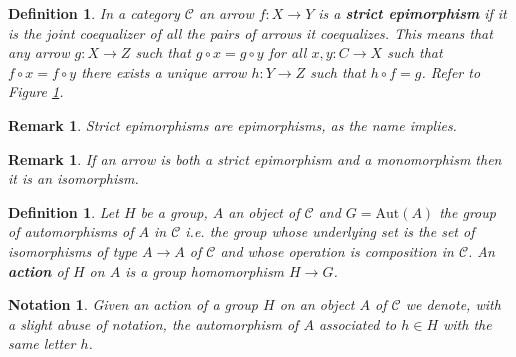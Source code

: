 \documentclass[italian, 12pt, reqno]{article}
\theoremstyle{myteo}
\newtheorem{definition}[theorem]{Definition}
\newtheorem{remark}[theorem]{Remark}
\newtheorem{notation}[theorem]{Notation}
\numberwithin{equation}{section}
\newcommand{\cat}[1]{\mathscr{#1}}
\newcommand{\aut}{\text{Aut}}
\newcommand{\fun}[3]{#1\colon#2\to #3}
\begin{document}
\begin{definition}
  \label{def:strit_epi}
  In a category \(\cat{C}\) an arrow \(\fun{f}{X}{Y}\) is a \textbf{strict epimorphism} if it is the joint coequalizer of all the pairs of arrows it coequalizes.
  This means that any arrow \(\fun{g}{X}{Z}\) such that \(g\circ x = g\circ y\) for all \(\fun{x,y}{C}{X}\) such that \(f\circ x = f\circ y\) there exists a unique arrow \(\fun{h}{Y}{Z}\) such that \(h\circ f = g\).
  Refer to Figure \ref{diagram:strict_epi}.
\end{definition}

\begin{figure}[h]
  \begin{center}
  \end{center}
  \caption{}
  \label{diagram:strict_epi}
\end{figure}

\begin{remark}
  \label{rem:strict_epi}
  Strict epimorphisms are epimorphisms, as the name implies.
\end{remark}

\begin{remark}
  \label{rem:strict_epi_plus_mono}
  If an arrow is both a strict epimorphism and a monomorphism then it is an isomorphism.
\end{remark}

\begin{definition}
  \label{def:action}
  Let \(H\) be a group, \(A\) an object of \(\cat{C}\) and \(G = \aut(A)\) the group of automorphisms of \(A\) in \(\cat{C}\) i.e. the group whose underlying set is the set of isomorphisms of type \(A\to A\) of \(\cat{C}\) and whose operation is composition in \(\cat{C}\).
  An \textbf{action} of \(H\) on \(A\) is a group homomorphism \(H \to G\).
\end{definition}

\begin{notation}
  \label{not:action}
	Given an action of a group \(H\) on an object \(A\) of \(\cat{C}\) we denote, with a slight abuse of notation, the automorphism of \(A\) associated to \(h\in H\) with the same letter \(h\).
\end{notation}
\end{document}
